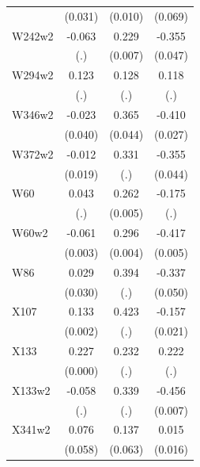 \begin{table}[htbp]
\begin{tabular}{l*{3}{c}}
                &  (0.031)         &  (0.010)         &  (0.069)         \\
W242w2          &   -0.063         &    0.229\sym{***}&   -0.355\sym{***}\\
                &      (.)         &  (0.007)         &  (0.047)         \\
W294w2          &    0.123         &    0.128         &    0.118         \\
                &      (.)         &      (.)         &      (.)         \\
W346w2          &   -0.023         &    0.365\sym{***}&   -0.410\sym{***}\\
                &  (0.040)         &  (0.044)         &  (0.027)         \\
W372w2          &   -0.012         &    0.331         &   -0.355\sym{***}\\
                &  (0.019)         &      (.)         &  (0.044)         \\
W60             &    0.043         &    0.262\sym{***}&   -0.175         \\
                &      (.)         &  (0.005)         &      (.)         \\
W60w2           &   -0.061\sym{***}&    0.296\sym{***}&   -0.417\sym{***}\\
                &  (0.003)         &  (0.004)         &  (0.005)         \\
W86             &    0.029         &    0.394         &   -0.337\sym{***}\\
                &  (0.030)         &      (.)         &  (0.050)         \\
X107            &    0.133\sym{***}&    0.423         &   -0.157\sym{***}\\
                &  (0.002)         &      (.)         &  (0.021)         \\
X133            &    0.227\sym{***}&    0.232         &    0.222         \\
                &  (0.000)         &      (.)         &      (.)         \\
X133w2          &   -0.058         &    0.339         &   -0.456\sym{***}\\
                &      (.)         &      (.)         &  (0.007)         \\
X341w2          &    0.076         &    0.137\sym{**} &    0.015         \\
                &  (0.058)         &  (0.063)         &  (0.016)         \\

\end{tabular}
\end{table}
